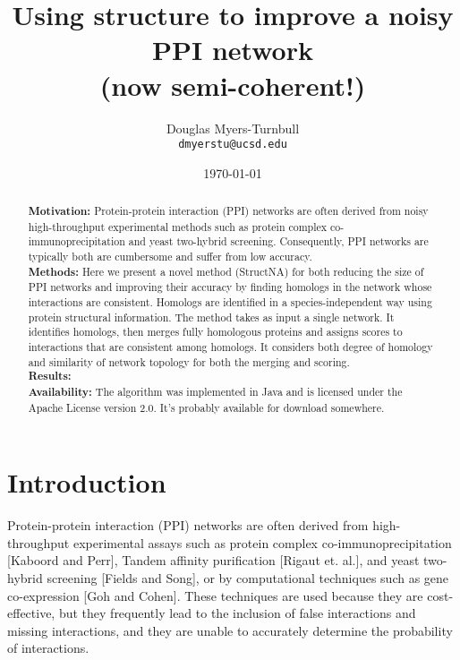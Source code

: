 \documentclass[12pt,twoside]{article}
\def\NI{\noindent}
\begin{document}
\title{\textbf{Using structure to improve a noisy PPI network} \\ \Large{(now semi-coherent!)}}
\author{Douglas Myers-Turnbull\\ \texttt{dmyerstu@ucsd.edu}}
\date{\small{\today}}
\maketitle

\begin{abstract}
\NI \textbf{Motivation: } Protein-protein interaction (PPI) networks are often derived from noisy high-throughput experimental methods such as protein complex co-immunoprecipitation and yeast two-hybrid screening. Consequently, PPI networks are typically both are cumbersome and suffer from low accuracy.\\
\NI \textbf{Methods: } Here we present a novel method (StructNA) for both reducing the size of PPI networks and improving their accuracy by finding homologs in the network whose interactions are consistent. Homologs are identified in a species-independent way using protein structural information. The method takes as input a single network. It identifies homologs, then merges fully homologous proteins and assigns scores to  interactions that are consistent among homologs. It considers both degree of homology and similarity of network topology for both the merging and scoring.\\
\NI \textbf{Results: }\\
\NI \textbf{Availability: } The algorithm was implemented in Java and is licensed under the Apache License version 2.0. It's probably available for download somewhere.
\end{abstract}

\section{Introduction}
\NI Protein-protein interaction (PPI) networks are often derived from high-throughput experimental assays such as protein complex co-immunoprecipitation [Kaboord and Perr], Tandem affinity purification [Rigaut et. al.], and yeast two-hybrid screening [Fields and Song], or by computational techniques such as gene co-expression [Goh and Cohen]. These techniques are used because they are cost-effective, but they frequently lead to the inclusion of false interactions and missing interactions, and they are unable to accurately determine the probability of interactions.
\end{document}

